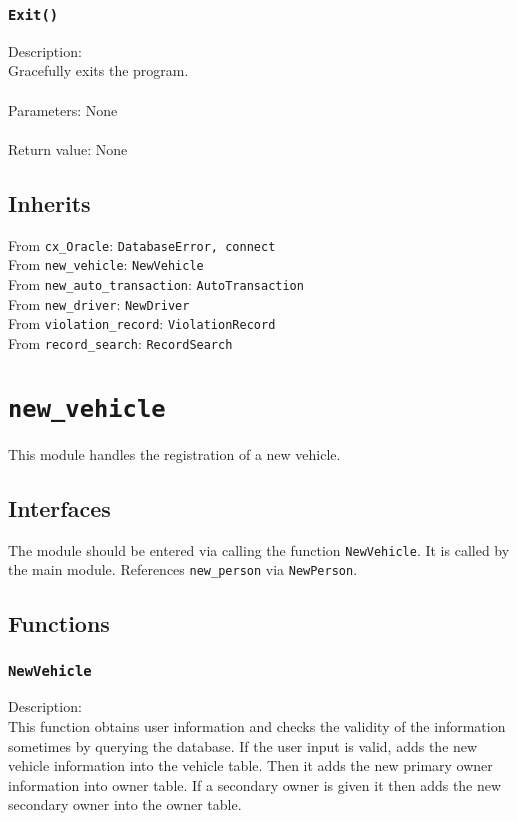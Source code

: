 \documentclass[12pt]{article}
\begin{document}
\subsubsection{\texttt{Exit()}}
Description: \\
\indent Gracefully exits the program.\\\\
Parameters: None\\\\
Return value: None


\subsection{Inherits}
From \texttt{cx\_Oracle}: \texttt{DatabaseError, connect}\\
From \texttt{new\_vehicle}: \texttt{NewVehicle}\\
From \texttt{new\_auto\_transaction}: \texttt{AutoTransaction}\\
From \texttt{new\_driver}: \texttt{NewDriver}\\
From \texttt{violation\_record}: \texttt{ViolationRecord}\\
From \texttt{record\_search}: \texttt{RecordSearch}

\newpage
\section{\texttt{new\_vehicle}}
This module handles the registration of a new vehicle.
\subsection{Interfaces}
The module should be entered via calling the function \texttt{NewVehicle}. It is called by the main module.
References \texttt{new\_person} via \texttt{NewPerson}.
\subsection{Functions}
\subsubsection{\texttt{NewVehicle}}
Description:\\
\indent This function obtains user information and checks the
validity of the information sometimes by querying the
database. If the user input is valid, adds the new vehicle
information into the vehicle table.
Then it adds the new primary owner information into owner table.
If a secondary owner is given it then adds the new secondary
owner into the owner table.
\end{document}
